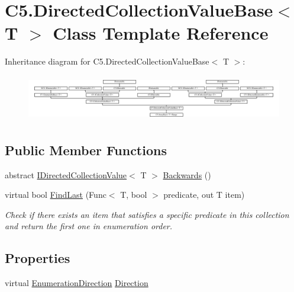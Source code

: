 \hypertarget{class_c5_1_1_directed_collection_value_base}{}\section{C5.\+Directed\+Collection\+Value\+Base$<$ T $>$ Class Template Reference}
\label{class_c5_1_1_directed_collection_value_base}


 


Inheritance diagram for C5.\+Directed\+Collection\+Value\+Base$<$ T $>$\+:\begin{figure}[H]
\begin{center}
\leavevmode
\includegraphics[height=2.033898cm]{class_c5_1_1_directed_collection_value_base}
\end{center}
\end{figure}
\subsection*{Public Member Functions}
\begin{DoxyCompactItemize}
\item 
abstract \hyperlink{interface_c5_1_1_i_directed_collection_value}{I\+Directed\+Collection\+Value}$<$ T $>$ \hyperlink{class_c5_1_1_directed_collection_value_base_a66d4222e083371d053e609efeecac740}{Backwards} ()
\item 
virtual bool \hyperlink{class_c5_1_1_directed_collection_value_base_af3d97f14823310f6afd1980d181a4f82}{Find\+Last} (Func$<$ T, bool $>$ predicate, out T item)
\begin{DoxyCompactList}\small\item\em Check if there exists an item that satisfies a specific predicate in this collection and return the first one in enumeration order. \end{DoxyCompactList}\end{DoxyCompactItemize}
\subsection*{Properties}
\begin{DoxyCompactItemize}
\item 
virtual \hyperlink{namespace_c5_aad282676794e49130eb8caed289395f8}{Enumeration\+Direction} \hyperlink{class_c5_1_1_directed_collection_value_base_acb1489d931bddb60b2d220b60e355021}{Direction}
\end{DoxyCompactItemize}
